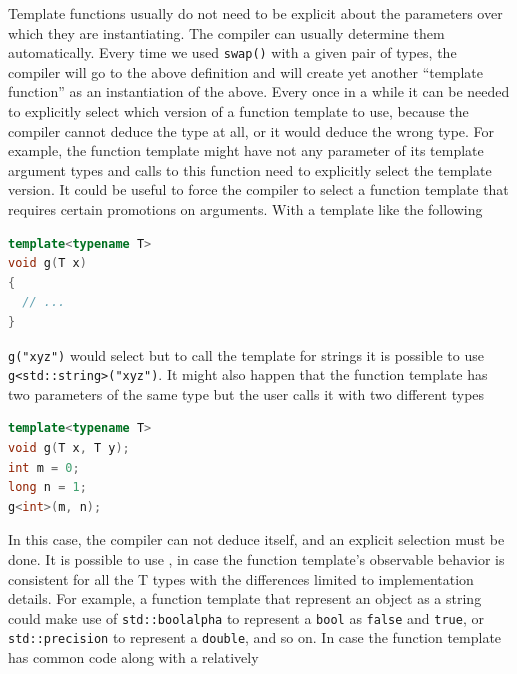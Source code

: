 Template functions usually do not need to be explicit about the parameters 
over which they are instantiating. The compiler can usually determine 
them automatically. Every time we used \texttt{swap()} with a given pair 
of types, the compiler will go to the above definition and will create 
yet another “template function” as an instantiation of the above.
\newline
Every once in a while it can be needed to explicitly select which version 
of a function template to use, because the compiler cannot deduce the type 
at all, or it would deduce the wrong type.
\newline
For example, the function template might have not any parameter of its 
template argument types 
and calls to this function need to explicitly select the template version.
\newline
It could be useful to force the compiler to select a function template 
that requires certain promotions on arguments. With a 
template like the following
\begin{lstlisting}[language=C++]
template<typename T>
void g(T x)
{
  // ...
}
\end{lstlisting}
\texttt{g("xyz")} would select  but to call the 
template for strings it is possible to use \texttt{g<std::string>("xyz")}. 
\newline
It might also happen that the function template has two parameters of the  
same type but the user calls it with two different types
\begin{lstlisting}[language=C++]
template<typename T>
void g(T x, T y);
int m = 0;
long n = 1;
g<int>(m, n);
\end{lstlisting}
In this case, the compiler can not deduce itself, and an explicit selection 
must be done.
\newline
It is possible to use , in case the 
function template’s observable behavior is consistent for all 
the T types with the differences limited to implementation details. 
For example, a function template that represent an object as a string 
could make use of \texttt{std::boolalpha} to represent a \texttt{bool} as 
\texttt{false} and \texttt{true}, or \texttt{std::precision} to represent a 
\texttt{double}, and so on.
\newline
In case the function template has common code along with a relatively 
